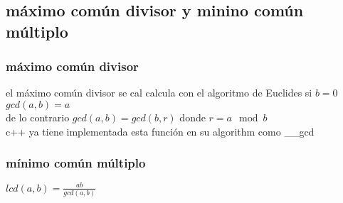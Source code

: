 \subsection{máximo común divisor y minino común múltiplo}
\subsubsection{máximo común divisor}
el máximo común divisor se cal calcula con el algoritmo de Euclides
si $b=0$  $gcd(a,b)=a$\\
de lo contrario $ gcd(a,b)=gcd(b,r)$ donde $r=a \mod{b}$\\
c++ ya tiene implementada esta función en su  algorithm como \_\_gcd

\subsubsection{mínimo común múltiplo}
$lcd(a,b)=\frac{ab}{gcd(a,b)}$
